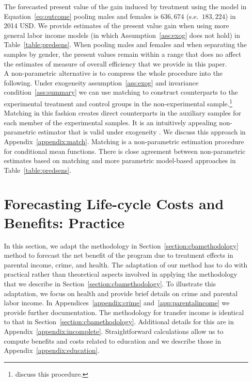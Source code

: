 \noindent The forecasted present value of the gain induced by treatment using the model in Equation~\eqref{eq:outcome} pooling males and females is $636,674$ (s.e.\ $183,224$) in 2014 USD. We provide estimates of the present value gain when using more general labor income models (in which Assumption~\ref{ass:exog} does not hold) in Table~\ref{table:predsens}. When pooling males and females and when separating the samples by gender, the present values remain within a range that does no affect the estimates of measure of overall efficiency that we provide in this paper.\\

\noindent A non-parametric alternative is to compress the whole procedure into the following. Under exogeneity assumption~\ref{ass:exog} and invariance condition~\ref{ass:summary} we can use matching to construct counterparts to the experimental treatment and control groups in the non-experimental sample.\footnote{\citet{Heckman_Ichimura_etal_1998_Econometrica} discuss this procedure.} Matching in this fashion creates direct counterparts in the auxiliary samples for each member of the experimental samples. It is an intuitively appealing non-parametric estimator that is valid under exogeneity \citep{Heckman_Navarro_2004_REStat}. We discuss this approach in Appendix~\ref{appendix:match}. Matching is a non-parametric estimation procedure for conditional mean functions. There is close agreement between non-parametric estimates based on matching and more parametric model-based approaches in Table~\ref{table:predsens}.

\section{Forecasting Life-cycle Costs and Benefits: Practice} \label{section:cbapractice}

\noindent In this section, we adapt the methodology in Section~\ref{section:cbamethodology} method to forecast the net benefit of the program due to treatment effects in parental income, crime, and health. The adaptation of our method has to do with practical rather than theoretical aspects involved in applying the methodology that we describe in Section~\ref{section:cbamethodology}. To illustrate this adaptation, we focus on health and provide brief details on crime and parental labor income. In Appendices~\ref{appendix:crime} and~\ref{app:parentalincome} we provide further documentation. The methodology for transfer income is identical to that in Section~\ref{section:cbamethodology}. Additional details for this are in Appendix~\ref{appendix:incomplete}. Straightforward calculations allow us to compute benefits and costs related to education and we describe those in Appendix~\ref{appendix:education}.

